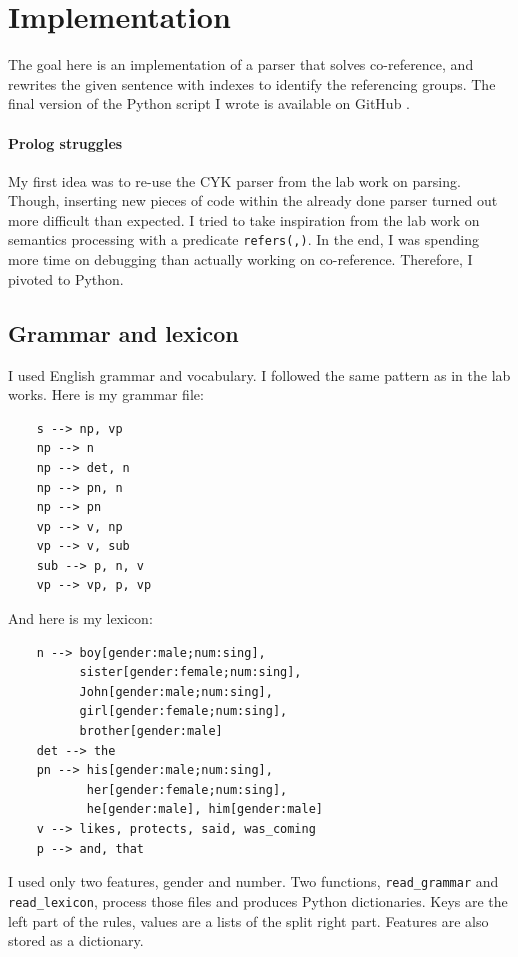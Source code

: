 \documentclass[a4paper]{article}
\theoremstyle{definition}
\begin{document}
\section{Implementation}

The goal here is an implementation of a parser that solves co-reference, and rewrites the given sentence with indexes to identify the referencing groups. The final version of the Python script I wrote is available on GitHub \cite{github}.

\paragraph{Prolog struggles} My first idea was to re-use the CYK parser from the lab work on parsing. Though, inserting new pieces of code within the already done parser turned out more difficult than expected. I tried to take inspiration from the lab work on semantics processing with a predicate \texttt{refers(,)}. In the end, I was spending more time on debugging than actually working on co-reference. Therefore, I pivoted to Python.

\subsection{Grammar and lexicon}

I used English grammar and vocabulary. I followed the same pattern as in the lab works. Here is my grammar file:
\begin{verbatim}
    s --> np, vp
    np --> n
    np --> det, n
    np --> pn, n
    np --> pn
    vp --> v, np
    vp --> v, sub
    sub --> p, n, v
    vp --> vp, p, vp
\end{verbatim}
And here is my lexicon:
\begin{verbatim}
    n --> boy[gender:male;num:sing],
          sister[gender:female;num:sing],
          John[gender:male;num:sing],
          girl[gender:female;num:sing],
          brother[gender:male]
    det --> the
    pn --> his[gender:male;num:sing],
           her[gender:female;num:sing],
           he[gender:male], him[gender:male]
    v --> likes, protects, said, was_coming
    p --> and, that
\end{verbatim}
I used only two features, gender and number. Two functions, \texttt{read\_grammar} and \texttt{read\_lexicon}, process those files and produces Python dictionaries. Keys are the left part of the rules, values are a lists of the split right part. Features are also stored as a dictionary.
\end{document}
